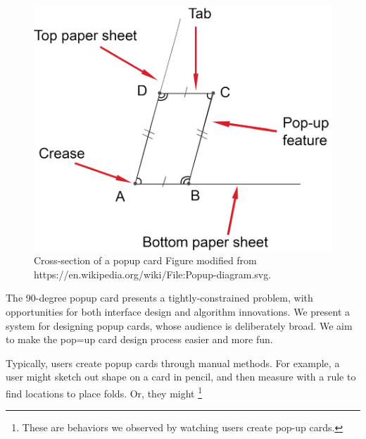 \begin{figure}[htbp]
\centering
\includegraphics{figures/shared/01_Background/popup-diagram.pdf}
\caption{Cross-section of a popup card Figure modified from
https://en.wikipedia.org/wiki/File:Popup-diagram.svg.}
\end{figure}

The 90-degree popup card presents a tightly-constrained problem, with
opportunities for both interface design and algorithm innovations. We
present a system for designing popup cards, whose audience is
deliberately broad. We aim to make the pop=up card design process easier
and more fun.

Typically, users create popup cards through manual methods. For example,
a user might sketch out shape on a card in pencil, and then measure with
a rule to find locations to place folds. Or, they might \footnote{These
  are behaviors we observed by watching users create pop-up cards.}
